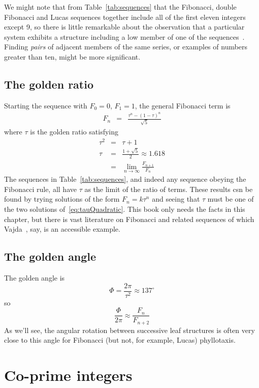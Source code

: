 We might note that from Table~\ref{tab:sequences} that the Fibonacci, double Fibonacci and Lucas sequences together include all  of the first eleven integers except 9, so there is little remarkable about the observation that a particular system exhibits a structure including a low member of one of the sequences~\cite{cookeFibonacciNumbersReveal2006}. Finding \textit{pairs} of adjacent members of the same series, or examples of numbers greater than ten, might be more significant.

\subsection{The golden ratio}
Starting the sequence with $F_0=0$, $F_1=1$, the general Fibonacci term is 
\begin{eqnarray}
F_n &=& \frac{\tau^n - (1-\tau)^n}{\sqrt{5}}
\end{eqnarray}
where $\tau$ is the golden ratio 
satisfying
\begin{eqnarray}
\tau^2 &=& \tau+1 \label{eq:tauQuadratic}
\\
\tau &=& \frac{1+\sqrt{5}}{2} \approx 1.618
\\
&=& \lim_{n\rightarrow\infty} \frac{F_{n+1}}{F_n} 
\end{eqnarray}
The sequences in Table~\ref{tab:sequences}, and indeed any sequence obeying the Fibonacci rule, all have $\tau$  as the limit of the ratio of terms. These results csn be found by trying solutions of the form $F_n=k\tau^n$ and seeing that $\tau$ must be one of the two solutions of~\eqref{eq:tauQuadratic}. This book only needs the facts in this chapter, but there is vast literature on Fibonacci and related sequences of which Vajda~\cite{vajdaFibonacciLucasNumbers2008}, say, is an  accessible example. 

\subsection{The golden angle}
The golden angle is
\[
\Phi = \frac{2\pi}{\tau^2}  \approx 137^\circ
\]
so
\[
\frac{\Phi}{2 \pi} \approx \frac{F_{n}}{F_{n+2}}
\]
As we'll see, the angular rotation between successive leaf structures is often very close to this angle for Fibonacci (but not, for example, Lucas) phyllotaxis.




\section{Co-prime integers}

